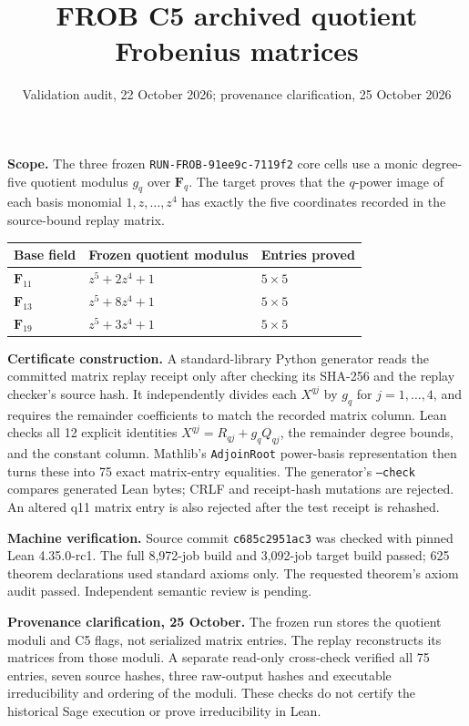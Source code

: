 \documentclass[10pt]{article}
\title{FROB C5 archived quotient Frobenius matrices}
\author{Validation audit, 22 October 2026; provenance clarification, 25 October 2026}
\date{}
\begin{document}
\maketitle
\vspace{-2em}

\textbf{Scope.} The three frozen \texttt{RUN-FROB-91ee9c-7119f2} core cells use a
monic degree-five quotient modulus $g_q$ over $\mathbf F_q$. The target proves
that the $q$-power image of each basis monomial $1,z,\ldots,z^4$ has exactly
the five coordinates recorded in the source-bound replay matrix.

\begin{center}
\begin{tabular}{lll}
\toprule
Base field & Frozen quotient modulus & Entries proved \\
\midrule
$\mathbf F_{11}$ & $z^5+2z^4+1$ & $5\times5$ \\
$\mathbf F_{13}$ & $z^5+8z^4+1$ & $5\times5$ \\
$\mathbf F_{19}$ & $z^5+3z^4+1$ & $5\times5$ \\
\bottomrule
\end{tabular}
\end{center}

\textbf{Certificate construction.} A standard-library Python generator reads
the committed matrix replay receipt only after checking its SHA-256 and the
replay checker's source hash. It independently divides each $X^{qj}$ by
$g_q$ for $j=1,\ldots,4$, and requires the remainder coefficients to match
the recorded matrix column. Lean checks all 12 explicit identities
$X^{qj}=R_{qj}+g_qQ_{qj}$, the remainder degree bounds, and the constant
column. Mathlib's \texttt{AdjoinRoot} power-basis representation then turns
these into 75 exact matrix-entry equalities. The generator's \texttt{--check}
compares generated Lean bytes; CRLF and receipt-hash mutations are rejected.
An altered q11 matrix entry is also rejected after the test receipt is rehashed.

\textbf{Machine verification.} Source commit \texttt{c685c2951ac3} was
checked with pinned Lean 4.35.0-rc1. The full 8,972-job build and 3,092-job
target build passed; 625 theorem declarations used standard axioms only.
The requested theorem's axiom audit passed. Independent semantic review is pending.

\textbf{Provenance clarification, 25 October.} The frozen run stores the
quotient moduli and C5 flags, not serialized matrix entries. The replay
reconstructs its matrices from those moduli. A separate read-only cross-check
verified all 75 entries, seven source hashes, three raw-output hashes and
executable irreducibility and ordering of the moduli. These checks do not
certify the historical Sage execution or prove irreducibility in Lean.
\end{document}
